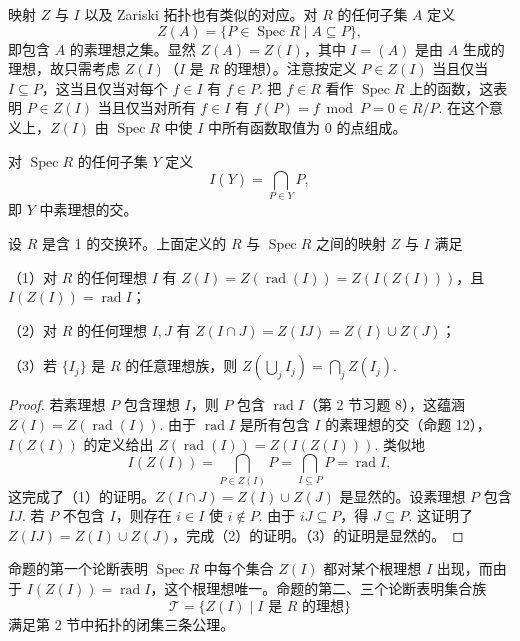 映射 \(Z\) 与 \(I\) 以及 Zariski 拓扑也有类似的对应。对 \(R\) 的任何子集 \(A\) 定义
\[
Z(A) = \{P \in \operatorname{Spec}R \mid A \subseteq P\},
\]
即包含 \(A\) 的素理想之集。显然 \(Z(A) = Z(I)\)，其中 \(I = (A)\) 是由 \(A\) 生成的理想，故只需考虑 \(Z(I)\)（\(I\) 是 \(R\) 的理想）。注意按定义 \(P \in Z(I)\) 当且仅当 \(I \subseteq P\)，这当且仅当对每个 \(f \in I\) 有 \(f \in P\). 把 \(f \in R\) 看作 \(\operatorname{Spec}R\) 上的函数，这表明 \(P \in Z(I)\) 当且仅当对所有 \(f \in I\) 有 \(f(P) = f \bmod P = 0 \in R/P\). 在这个意义上，\(Z(I)\) 由 \(\operatorname{Spec}R\) 中使 \(I\) 中所有函数取值为 0 的点组成。

对 \(\operatorname{Spec}R\) 的任何子集 \(Y\) 定义
\[
I(Y) = \bigcap_{P \in Y}P,
\]
即 \(Y\) 中素理想的交。

\begin{proposition}\label{pro:15.53}
设 \(R\) 是含 1 的交换环。上面定义的 \(R\) 与 \(\operatorname{Spec}R\) 之间的映射 \(Z\) 与 \(I\) 满足

（1）对 \(R\) 的任何理想 \(I\) 有 \(Z(I) = Z(\operatorname{rad}(I)) = Z(I(Z(I)))\)，且 \(I(Z(I)) = \operatorname{rad}I\)；

（2）对 \(R\) 的任何理想 \(I, J\) 有 \(Z(I \cap J) = Z(IJ) = Z(I) \cup Z(J)\)；

（3）若 \(\{I_j\}\) 是 \(R\) 的任意理想族，则 \(Z(\bigcup_jI_j) = \bigcap_jZ(I_j)\).
\end{proposition}

\begin{proof}
若素理想 \(P\) 包含理想 \(I\)，则 \(P\) 包含 \(\operatorname{rad}I\)（第 2 节习题 8），这蕴涵 \(Z(I) = Z(\operatorname{rad}(I))\). 由于 \(\operatorname{rad}I\) 是所有包含 \(I\) 的素理想的交（命题 12），\(I(Z(I))\) 的定义给出 \(Z(\operatorname{rad}(I)) = Z(I(Z(I)))\). 类似地
\[
I(Z(I)) = \bigcap_{P \in Z(I)}P = \bigcap_{I \subseteq P}P = \operatorname{rad}I,
\]
这完成了（1）的证明。\(Z(I \cap J) = Z(I) \cup Z(J)\) 是显然的。设素理想 \(P\) 包含 \(IJ\). 若 \(P\) 不包含 \(I\)，则存在 \(i \in I\) 使 \(i \notin P\). 由于 \(iJ \subseteq P\)，得 \(J \subseteq P\). 这证明了 \(Z(IJ) = Z(I) \cup Z(J)\)，完成（2）的证明。（3）的证明是显然的。
\end{proof}

命题的第一个论断表明 \(\operatorname{Spec}R\) 中每个集合 \(Z(I)\) 都对某个根理想 \(I\) 出现，而由于 \(I(Z(I)) = \operatorname{rad}I\)，这个根理想唯一。命题的第二、三个论断表明集合族
\[
\mathcal{T} = \{Z(I) \mid I \text{ 是 } R \text{ 的理想}\}
\]
满足第 2 节中拓扑的闭集三条公理。

